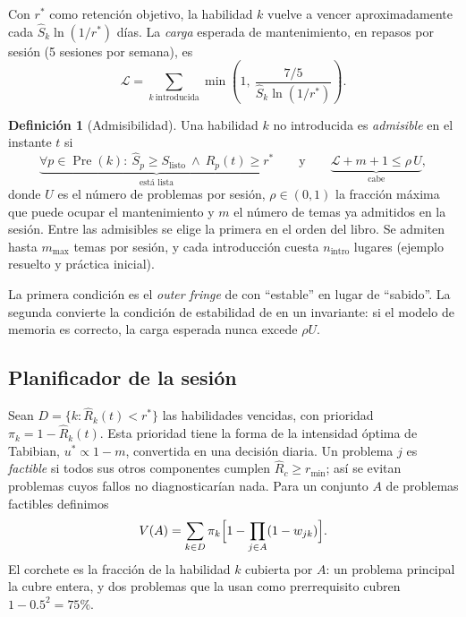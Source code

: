 \documentclass[11pt]{article}
\theoremstyle{definition}
\newtheorem{definicion}{Definición}
\theoremstyle{remark}
\newcommand{\Pre}{\operatorname{Pre}}
\newcommand{\Rh}{\hat R}
\newcommand{\Sh}{\hat S}
\newcommand{\rstar}{r^{\ast}}
\newcommand{\Slisto}{S_{\mathrm{listo}}}
\begin{document}
Con $\rstar$ como retención objetivo, la habilidad $k$ vuelve a vencer aproximadamente cada $\Sh_k\ln(1/\rstar)$ días. La \emph{carga} esperada de mantenimiento, en repasos por sesión (5 sesiones por semana), es
\begin{equation}
\mathcal L=\sum_{k\ \text{introducida}}\min\!\left(1,\ \frac{7/5}{\Sh_k\ln(1/\rstar)}\right).
\label{eq:carga}
\end{equation}

\begin{definicion}[Admisibilidad]
Una habilidad $k$ no introducida es \emph{admisible} en el instante $t$ si
\begin{equation}
\underbrace{\forall p\in\Pre(k):\ \Sh_p\ge\Slisto\ \wedge\ \Rh_p(t)\ge\rstar}_{\text{está lista}}
\qquad\text{y}\qquad
\underbrace{\mathcal L+m+1\le\rho\,U}_{\text{cabe}},
\label{eq:admision}
\end{equation}
donde $U$ es el número de problemas por sesión, $\rho\in(0,1)$ la fracción máxima que puede ocupar el mantenimiento y $m$ el número de temas ya admitidos en la sesión. Entre las admisibles se elige la primera en el orden del libro. Se admiten hasta $m_{\max}$ temas por sesión, y cada introducción cuesta $n_{\mathrm{intro}}$ lugares (ejemplo resuelto y práctica inicial).
\end{definicion}

La primera condición es el \emph{outer fringe} de \citet{doignon1985} con ``estable'' en lugar de ``sabido''. La segunda convierte la condición de estabilidad de \citet{reddy2016} en un invariante: si el modelo de memoria es correcto, la carga esperada nunca excede $\rho U$.

\subsection{Planificador de la sesión}
\label{sec:planificador}

Sean $D=\{k:\Rh_k(t)<\rstar\}$ las habilidades vencidas, con prioridad $\pi_k=1-\Rh_k(t)$. Esta prioridad tiene la forma de la intensidad óptima de Tabibian, $u^\ast\propto 1-m$, convertida en una decisión diaria. Un problema $j$ es \emph{factible} si todos sus otros componentes cumplen $\Rh_c\ge r_{\min}$; así se evitan problemas cuyos fallos no diagnosticarían nada. Para un conjunto $A$ de problemas factibles definimos
\begin{equation}
V(A)=\sum_{k\in D}\pi_k\Bigl[1-\prod_{j\in A}(1-w_{jk})\Bigr].
\label{eq:cobertura}
\end{equation}
El corchete es la fracción de la habilidad $k$ cubierta por $A$: un problema principal la cubre entera, y dos problemas que la usan como prerrequisito cubren $1-0.5^2=75\%$.
\end{document}
